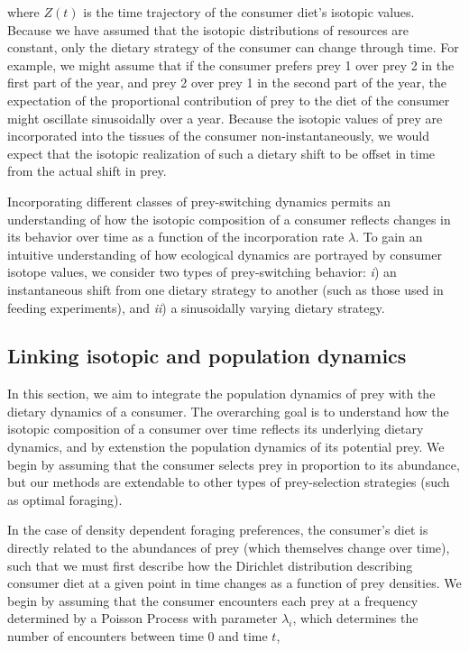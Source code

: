 \documentclass[11pt]{article}
\begin{document}
\noindent where $Z(t)$ is the time trajectory of the consumer diet's isotopic values.
Because we have assumed that the isotopic distributions of resources are constant, only the dietary strategy of the consumer can change through time.
For example, we might assume that if the consumer prefers prey 1 over prey 2 in the first part of the year, and prey 2 over prey 1 in the second part of the year, the expectation of the proportional contribution of prey to the diet of the consumer might oscillate sinusoidally over a year.
Because the isotopic values of prey are incorporated into the tissues of the consumer non-instantaneously, we would expect that the isotopic realization of such a dietary shift to be offset in time from the actual shift in prey.

Incorporating different classes of prey-switching dynamics permits an understanding of how the isotopic composition of a consumer reflects changes in its behavior over time as a function of the incorporation rate $\lambda$.
To gain an intuitive understanding of how ecological dynamics are portrayed by consumer isotope values, we consider two types of prey-switching behavior: {\it i}) an instantaneous shift from one dietary strategy to another (such as those used in feeding experiments), and {\it ii}) a sinusoidally varying dietary strategy.





\subsection{Linking isotopic and population dynamics}

In this section, we aim to integrate the population dynamics of prey with the dietary dynamics of a consumer.
The overarching goal is to understand how the isotopic composition of a consumer over time reflects its underlying dietary dynamics, and by extenstion the population dynamics of its potential prey.
We begin by assuming that the consumer selects prey in proportion to its abundance, but our methods are extendable to other types of prey-selection strategies (such as optimal foraging).

In the case of density dependent foraging preferences, the consumer's diet is directly related to the abundances of prey (which themselves change over time), such that we must first describe how the Dirichlet distribution describing consumer diet at a given point in time changes as a function of prey densities.
We begin by assuming that the consumer encounters each prey at a frequency determined by a Poisson Process with parameter $\lambda_i$, which determines the number of encounters between time 0 and time $t$,
\end{document}
